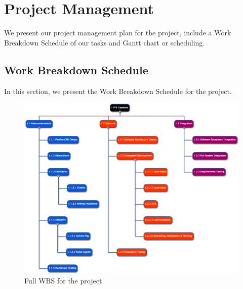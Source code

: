 
\section{Project Management}
\label{sec:project_management}
We present our project management plan for the project, include a Work Breakdown Schedule of our tasks and Gantt chart or scheduling.

\subsection{Work Breakdown Schedule}
\label{sec:wbs}

In this section, we present the Work Breakdown Schedule for the project.

\begin{figure}[h!]
\centering
\includegraphics[width=\textwidth]{wbs_schedule/wbs_1_31_17.png}
\caption{Full WBS for the project}
\label{fig:full-wbs}
\end{figure}

